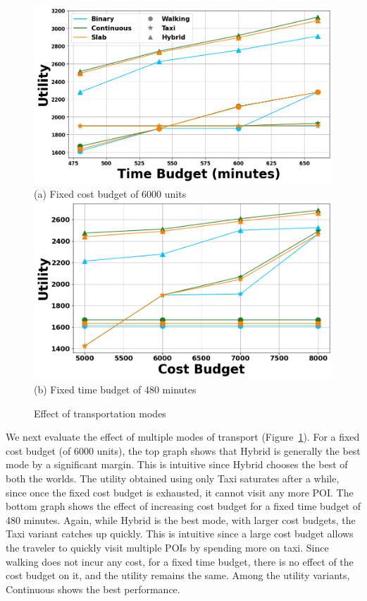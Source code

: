 \begin{figure}[t]
\centering
\includegraphics[width=\columnwidth]{plots/multimodality1.png}
(a) Fixed cost budget of 6000 units 
\includegraphics[width=\columnwidth]{plots/multimodality2.png}
(b) Fixed time budget of 480 minutes
\caption{Effect of transportation modes}
\label{fig:multi-modal}
\end{figure}

We next evaluate the effect of multiple modes of transport (Figure~\ref{fig:multi-modal}).
For a fixed cost budget (of 6000 units), the top graph shows that Hybrid is generally the best mode by a significant margin. This is intuitive since Hybrid chooses the best of both the worlds.
The utility obtained using only Taxi saturates after a while, since once the fixed cost budget is exhausted, it cannot visit any more POI.
The bottom graph shows the effect of increasing cost budget for a fixed time budget of 480 minutes.
Again, while Hybrid is the best mode, with larger cost budgets, the Taxi variant catches up quickly.
This is intuitive since a large cost budget allows the traveler to quickly visit multiple POIs by spending more on taxi.
Since walking does not incur any cost, for a fixed time budget, there is no effect of the cost budget on it, and the utility remains the same.
Among the utility variants, Continuous shows the best performance.

